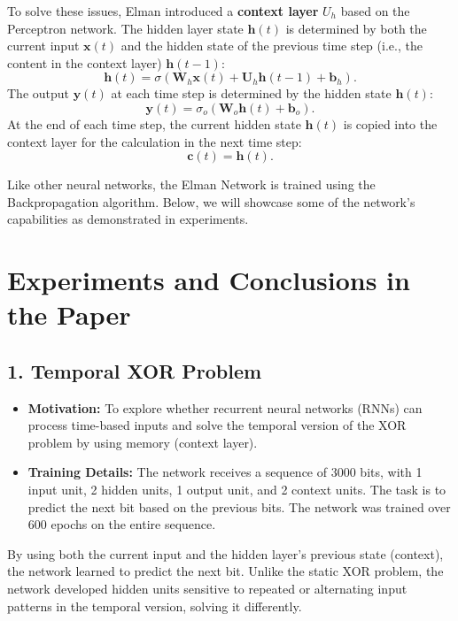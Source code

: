 \documentclass[11p,oneside]{book}
\begin{document}
To solve these issues, Elman introduced a \textbf{context layer} $U_h$ based on the Perceptron network. The hidden layer state $\mathbf{h}(t)$ is determined by both the current input $\mathbf{x}(t)$ and the hidden state of the previous time step (i.e., the content in the context layer) $\mathbf{h}(t-1)$:
\[
\mathbf{h}(t) = \sigma \left( \mathbf{W}_h \mathbf{x}(t) + \mathbf{U}_h \mathbf{h}(t-1) + \mathbf{b}_h \right).
\]
The output $\mathbf{y}(t)$ at each time step is determined by the hidden state $\mathbf{h}(t)$:
\[
\mathbf{y}(t) = \sigma_o \left( \mathbf{W}_o \mathbf{h}(t) + \mathbf{b}_o \right).
\]
At the end of each time step, the current hidden state $\mathbf{h}(t)$ is copied into the context layer for the calculation in the next time step:
\[
\mathbf{c}(t) = \mathbf{h}(t).
\]

Like other neural networks, the Elman Network is trained using the Backpropagation algorithm. Below, we will showcase some of the network's capabilities as demonstrated in experiments. \\

\section*{Experiments and Conclusions in the Paper}

\subsection*{1. Temporal XOR Problem}

\begin{itemize}
    \item \textbf{Motivation:} To explore whether recurrent neural networks (RNNs) can process time-based inputs and solve the temporal version of the XOR problem by using memory (context layer).
    \item \textbf{Training Details:} The network receives a sequence of 3000 bits, with 1 input unit, 2 hidden units, 1 output unit, and 2 context units. The task is to predict the next bit based on the previous bits. The network was trained over 600 epochs on the entire sequence.
\end{itemize}

By using both the current input and the hidden layer's previous state (context), the network learned to predict the next bit. Unlike the static XOR problem, the network developed hidden units sensitive to repeated or alternating input patterns in the temporal version, solving it differently. \\
\end{document}
